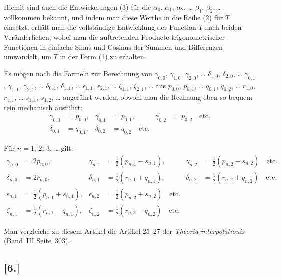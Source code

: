 \documentclass[12pt,a4paper]{article}
\begin{document}
Hiemit sind auch die Entwickelungen (3) für die $\alpha_0$, $\alpha_1$, $\alpha_2$, \ldots{} $\beta_1$, $\beta_2$, \ldots{} vollkommen bekannt, und indem man diese Werthe in die Reihe (2) für $T$ einsetzt, erhält man die vollständige Entwicklung der Function $T$ nach beiden Veränderlichen, wobei man die auftretenden Producte trigonometrischer Functionen in einfache Sinus und Cosinus der Summen und Differenzen umwandelt, um $T$ in der Form (1) zu erhalten.

Es mögen noch die Formeln zur Berechnung von $\gamma_{0,0}$, $\gamma_{1,0}$, $\gamma_{2,0}$, \ldots{} $\delta_{1,0}$, $\delta_{2,0}$, \ldots{} $\gamma_{0,1}$, $\gamma_{1,1}$, $\gamma_{2,1}$, \ldots{} $\delta_{0,1}$, $\delta_{1,1}$, \ldots{} $\epsilon_{1,1}$, $\epsilon_{2,1}$, \ldots{} $\zeta_{1,1}$, $\zeta_{2,1}$, \ldots{} aus $p_{0,0}$, $p_{0,1}$, \ldots{} $q_{0,1}$, $q_{0,2}$, \ldots{} $r_{1,0}$, $r_{1,1}$, \ldots{} $s_{1,1}$, $s_{1,2}$, \ldots{} angeführt werden, obwohl man die Rechnung eben so bequem rein mechanisch ausführt:
\begin{align*}
\gamma_{0,0} &= p_{0,0}, & \gamma_{0,1} &= p_{0,1}, & \gamma_{0,2} &= p_{0,2} \quad \text{etc.}\\
\delta_{0,1} &= q_{0,1}, & \delta_{0,2} &= q_{0,2} \quad \text{etc.}
\end{align*}

Für $n = 1$, $2$, $3$, \ldots{} gilt:
\begin{align*}
\gamma_{n,0} &= 2p_{n,0}, & \gamma_{n,1} &= \tfrac{1}{2}(p_{n,1} - s_{n,1}), & \gamma_{n,2} &= \tfrac{1}{2}(p_{n,2} - s_{n,2}) \quad \text{etc.}\\
\delta_{n,0} &= 2r_{n,0}, & \delta_{n,1} &= \tfrac{1}{2}(r_{n,1} + q_{n,1}), & \delta_{n,2} &= \tfrac{1}{2}(r_{n,2} + q_{n,2}) \quad \text{etc.}\\
\epsilon_{n,1} &= \tfrac{1}{2}(p_{n,1} + s_{n,1}), & \epsilon_{n,2} &= \tfrac{1}{2}(p_{n,2} + s_{n,2}) \quad \text{etc.}\\
\zeta_{n,1} &= \tfrac{1}{2}(r_{n,1} - q_{n,1}), & \zeta_{n,2} &= \tfrac{1}{2}(r_{n,2} - q_{n,2}) \quad \text{etc.}
\end{align*}

Man vergleiche zu diesem Artikel die Artikel 25--27 der \textit{Theoria interpolationis} (Band~III Seite~303).

\subsection*{[6.]}
\end{document}
